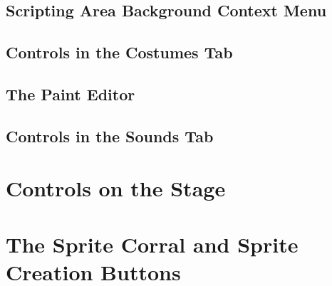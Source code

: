 \documentclass{report}
\begin{document}
\subsection{Scripting Area Background Context Menu}
\subsection{Controls in the Costumes Tab}
\subsection{The Paint Editor}
\subsection{Controls in the Sounds Tab}
\section{Controls on the Stage}
\section{The Sprite Corral and Sprite Creation Buttons}
\end{document}
